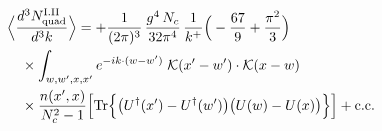 \begin{align}\label{eq:S-I.II-2o}
&\Big\langle\frac{d^{3}N^{\rm I.II}_{{\rm quad}}}{d^{3}k}\Big\rangle=+\frac{1}{(2\pi)^{3}}\, \frac{g^{4}\,N_{c}}{32\pi^{4}}\, \frac{1}{k^{+}}\Big(-\frac{67}{9}+\frac{\pi^{2}}{3}\Big)\notag\\
&\quad \times \int_{w,w',x,x'} e^{-ik\cdot(w-w')}\;\mathcal{K}(x'-w')\cdot\mathcal{K}(x-w)\notag\\
&\quad \times\frac{n(x',x)}{N_{c}^{2}-1}\Big[{\rm Tr}\Big\{\big(U^{\dagger}(x')-U^{\dagger}(w')\big)\big(U(w)-U(x)\big)\Big\}\Big] +{\rm c.c.}
\end{align}
